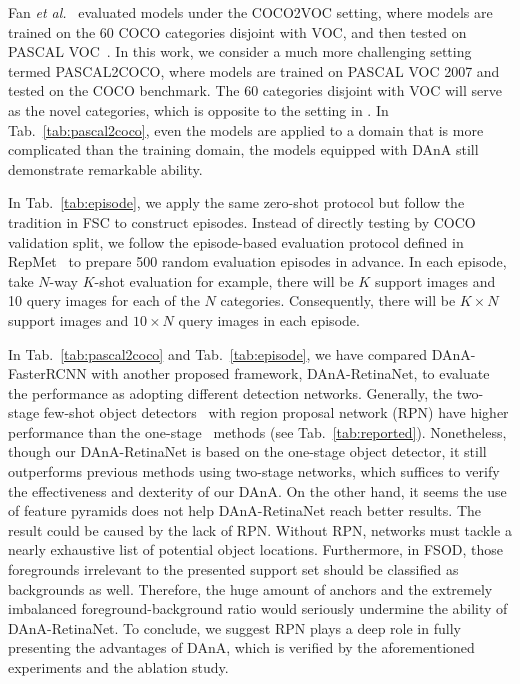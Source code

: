 \documentclass[journal]{IEEEtran}
\newcommand{\etal}{\textit{et al.}}
\begin{document}
Fan \etal~\cite{fan2020fgn} evaluated models under the COCO2VOC setting, where models are trained on the 60 COCO categories disjoint with VOC, and then tested on PASCAL VOC~\cite{everingham2010pascal}.
In this work, we consider a much more challenging setting termed PASCAL2COCO, where models are trained on PASCAL VOC 2007 and tested on the COCO benchmark.
The 60 categories disjoint with VOC will serve as the novel categories, which is opposite to the setting in \cite{fan2020fgn}. 
In Tab.~\ref{tab:pascal2coco}, even the models are applied to a domain that is more complicated than the training domain, the models equipped with DAnA still demonstrate remarkable ability.


In Tab.~\ref{tab:episode}, we apply the same zero-shot protocol but follow the tradition in FSC to construct episodes.
Instead of directly testing by COCO validation split, we follow the episode-based evaluation protocol defined in RepMet~\cite{karlinsky2019repmet} to prepare 500 random evaluation episodes in advance.
In each episode, take $N$-way $K$-shot evaluation for example, there will be $K$ support images and 10 query images for each of the $N$ categories.
Consequently, there will be $K\times N$ support images and $10\times N$ query images in each episode.


In Tab.~\ref{tab:pascal2coco} and Tab.~\ref{tab:episode}, we have compared DAnA-FasterRCNN with another proposed framework, DAnA-RetinaNet, to evaluate the performance as adopting different detection networks. 
Generally, the two-stage few-shot object detectors~\cite{wang2020frustratingly, yan2019meta, fan2020few, wu2020multi, xiao2020few} with region proposal network (RPN) have higher performance than the one-stage~\cite{kang2019few, perez2020incremental} methods (see Tab.~\ref{tab:reported}).
Nonetheless, though our DAnA-RetinaNet is based on the one-stage object detector, it still outperforms previous methods using two-stage networks, which suffices to verify the effectiveness and dexterity of our DAnA.
On the other hand, it seems the use of feature pyramids does not help DAnA-RetinaNet reach better results.
The result could be caused by the lack of RPN.
Without RPN, networks must tackle a nearly exhaustive list of potential object locations.
Furthermore, in FSOD, those foregrounds irrelevant to the presented support set should be classified as backgrounds as well.
Therefore, the huge amount of anchors and the extremely imbalanced foreground-background ratio would seriously undermine the ability of DAnA-RetinaNet.
To conclude, we suggest RPN plays a deep role in fully presenting the advantages of DAnA, which is verified by the aforementioned experiments and the ablation study.
\end{document}
